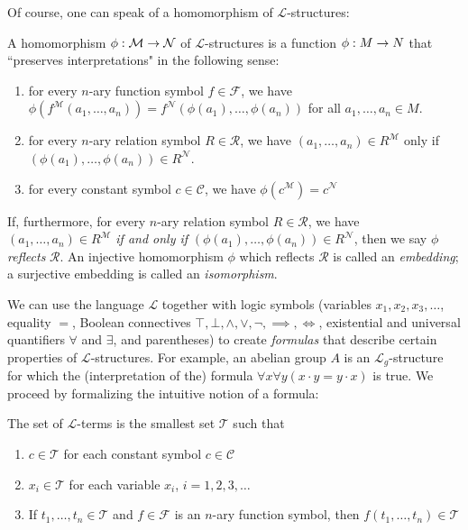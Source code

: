 Of course, one can speak of a homomorphism of $\mathcal{L}$-structures:

\begin{definition}
A homomorphism $\phi:\mathcal{M}\rightarrow \mathcal{N}$ of $\mathcal{L}$-structures is a function $\phi:M\rightarrow N$ that ``preserves interpretations" in the following sense:
\begin{enumerate}
	\item for every $n$-ary function symbol $f\in\mathcal{F}$, we have $\phi(f^{\mathcal{M}}(a_1,\dots, a_n))=f^{\mathcal{N}}(\phi(a_1),\dots, \phi(a_n))$ for all $a_1,\dots, a_n\in M$.
	\item for every $n$-ary relation symbol $R\in\mathcal{R}$, we have $(a_1,\dots, a_n)\in R^{\mathcal{M}}$ only if $(\phi(a_1),\dots, \phi(a_n))\in R^{\mathcal{N}}$.
	\item for every constant symbol $c\in\mathcal{C}$, we have $\phi(c^{\mathcal{M}})=c^{\mathcal{N}}$
\end{enumerate}
If, furthermore, for every $n$-ary relation symbol $R\in\mathcal{R}$, we have $(a_1,\dots, a_n)\in R^{\mathcal{M}}$ \emph{if and only if} $(\phi(a_1),\dots, \phi(a_n))\in R^{\mathcal{N}}$, then we say $\phi$ \emph{reflects} $\mathcal{R}$. An injective homomorphism $\phi$ which reflects $\mathcal{R}$ is called an \emph{embedding}; a surjective embedding is called an \emph{isomorphism}.
\end{definition}

We can use the language $\mathcal{L}$ together with logic symbols (variables $x_1,x_2,x_3,\dots$, equality $=$, Boolean connectives $\top, \bot, \wedge, \vee, \neg, \implies, \iff$, existential and universal quantifiers $\forall$ and $\exists$, and parentheses) to create \emph{formulas} that describe certain properties of $\mathcal{L}$-structures. For example, an abelian group $A$ is an $\mathcal{L}_g$-structure for which the (interpretation of the) formula $\forall x \forall y( x\cdot y = y\cdot x)$ is true. We proceed by formalizing the intuitive notion of a formula:

\begin{definition}
The set of $\mathcal{L}$-terms is the smallest set $\mathcal{T}$ such that 
\begin{enumerate}
	\item $c\in \mathcal{T}$ for each constant symbol $c\in\mathcal{C}$
	\item $x_i\in \mathcal{T}$ for each variable $x_i$, $i=1,2,3,\dots$
	\item If $t_1,\dots, t_n\in\mathcal{T}$ and $f\in\mathcal{F}$ is an $n$-ary function symbol, then $f(t_1,\dots, t_n)\in\mathcal{T}$
\end{enumerate} 
\end{definition}

